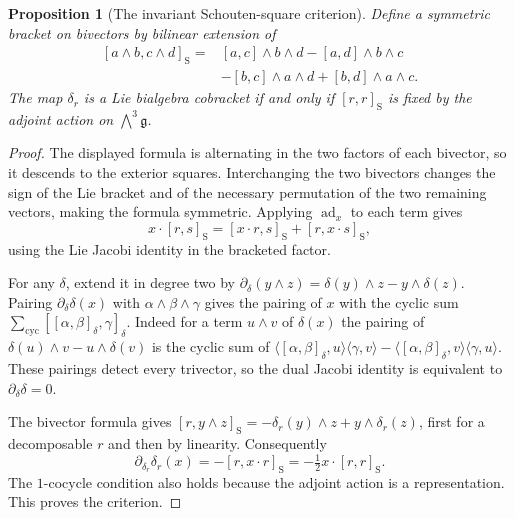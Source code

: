 \documentclass[11pt,oneside,openany]{book}
\newtheorem{proposition}[theorem]{Proposition}
\theoremstyle{definition}
\theoremstyle{remark}
\begin{document}
\begin{proposition}[The invariant Schouten-square criterion]
\label{res:LD05}
Define a symmetric bracket on bivectors by bilinear extension of
\[
 \begin{aligned}
 [a\wedge b,c\wedge d]_{\mathrm S}
   ={}&[a,c]\wedge b\wedge d-[a,d]\wedge b\wedge c\\
      &-[b,c]\wedge a\wedge d+[b,d]\wedge a\wedge c .
 \end{aligned}
\]
The map \(\delta_r\) is a Lie bialgebra cobracket if and only if
\([r,r]_{\mathrm S}\) is fixed by the adjoint action
on \(\bigwedge^3\mathfrak g\).
\end{proposition}
\begin{proof}
The displayed formula is alternating in the two factors of
each bivector, so it descends to the exterior squares.
Interchanging the two bivectors changes the sign of the Lie
bracket and of the necessary permutation of the two remaining
vectors, making the formula symmetric. Applying
\(\operatorname{ad}_x\) to each term gives
\[
 x\cdot[r,s]_{\mathrm S}=[x\cdot r,s]_{\mathrm S}
                         +[r,x\cdot s]_{\mathrm S},
\]
using the Lie Jacobi identity in the bracketed factor.

For any \(\delta\), extend it in degree two by
\(\partial_\delta(y\wedge z)=\delta(y)\wedge z-y\wedge\delta(z)\).
Pairing \(\partial_\delta\delta(x)\) with \(\alpha\wedge\beta\wedge\gamma\)
gives the pairing of \(x\) with the cyclic sum
\(\sum_{\mathrm{cyc}}[[\alpha,\beta]_\delta,\gamma]_\delta\).
Indeed for a term \(u\wedge v\) of \(\delta(x)\) the pairing of
\(\delta(u)\wedge v-u\wedge\delta(v)\) is the cyclic sum of
\(
\langle[\alpha,\beta]_\delta,u\rangle\langle\gamma,v\rangle
-\langle[\alpha,\beta]_\delta,v\rangle\langle\gamma,u\rangle
\).
These pairings detect every trivector, so the dual Jacobi
identity is equivalent to \(\partial_\delta\delta=0\).

The bivector formula gives
\([r,y\wedge z]_{\mathrm S}=-\delta_r(y)\wedge z+
y\wedge\delta_r(z)\), first for a decomposable \(r\)
and then by linearity. Consequently
\[
 \partial_{\delta_r}\delta_r(x)
      =-[r,x\cdot r]_{\mathrm S}
      =-\tfrac12 x\cdot[r,r]_{\mathrm S}.
\]
The \(1\)-cocycle condition also holds because the adjoint
action is a representation. This proves the criterion.
\end{proof}
\end{document}
